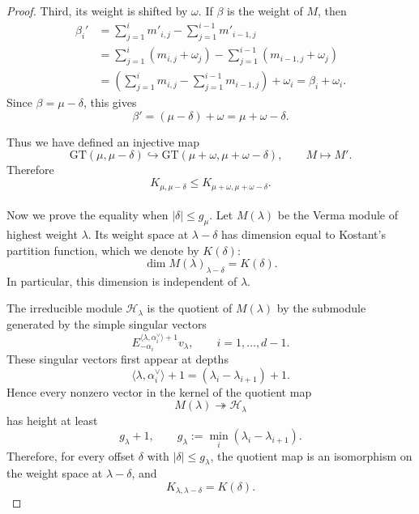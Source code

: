 \documentclass[a4paper,onecolumn,11pt]{quantumarticle}
\def\h{\mathcal{H}}
\begin{document}
\begin{proof}
Third, its weight is shifted by $\omega$. If $\beta$ is the weight of $M$, then
\begin{equation}
\begin{aligned}
    \beta_i'
    &=
    \sum_{j=1}^i m'_{i,j}
    -
    \sum_{j=1}^{i-1} m'_{i-1,j} \\
    &=
    \sum_{j=1}^i (m_{i,j}+\omega_j)
    -
    \sum_{j=1}^{i-1} (m_{i-1,j}+\omega_j) \\
    &=
    \left(\sum_{j=1}^i m_{i,j}-\sum_{j=1}^{i-1} m_{i-1,j}\right)+\omega_i
    = \beta_i+\omega_i.
\end{aligned}
\end{equation}
Since $\beta=\mu-\delta$, this gives
\begin{equation}
    \beta'=(\mu-\delta)+\omega=\mu+\omega-\delta.
\end{equation}

Thus we have defined an injective map
\begin{equation}
    \mathrm{GT}(\mu,\mu-\delta)\hookrightarrow
    \mathrm{GT}(\mu+\omega,\mu+\omega-\delta),
    \qquad
    M\mapsto M'.
\end{equation}
Therefore
\begin{equation}
    K_{\mu,\mu-\delta}\le K_{\mu+\omega,\mu+\omega-\delta}.
\end{equation}\\


Now we prove the equality when $|\delta|\le g_\mu$. Let $M(\lambda)$ be the Verma module of highest weight $\lambda$.
Its weight space at $\lambda-\delta$ has dimension equal to Kostant's partition function, which we denote by $K(\delta)$:
\begin{equation}
    \dim M(\lambda)_{\lambda-\delta}=K(\delta).
\end{equation}
In particular, this dimension is independent of $\lambda$.

The irreducible module $\h_\lambda$ is the quotient of $M(\lambda)$ by the submodule generated by the simple singular vectors
\begin{equation}
    E_{-\alpha_i}^{\langle \lambda,\alpha_i^\vee\rangle+1}v_\lambda,
    \qquad i=1,\dots,d-1.
\end{equation}
These singular vectors first appear at depths
\begin{equation}
    \langle \lambda,\alpha_i^\vee\rangle+1
    =
    (\lambda_i-\lambda_{i+1})+1.
\end{equation}
Hence every nonzero vector in the kernel of the quotient map
\begin{equation}
M(\lambda)\twoheadrightarrow \h_\lambda
\end{equation}
has height at least
\begin{equation}
    g_\lambda+1,
    \qquad
    g_\lambda:= \min_i(\lambda_i-\lambda_{i+1}).
\end{equation}
Therefore, for every offset $\delta$ with $|\delta|\le g_\lambda$, the quotient map is an isomorphism on the weight space at $\lambda-\delta$, and
\begin{equation}
    K_{\lambda,\lambda-\delta}=K(\delta).
\end{equation}


\end{proof}
\end{document}
